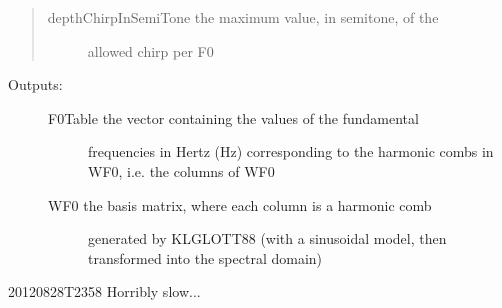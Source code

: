 \documentclass[letterpaper,10pt,english]{sphinxmanual}
\begin{document}
\begin{fulllineitems}
\begin{quote}
\begin{description}
\item[{depthChirpInSemiTone the maximum value, in semitone, of the}] \leavevmode
allowed chirp per F0

\end{description}
\end{quote}
\begin{description}
\item[{Outputs:}] \leavevmode\begin{description}
\item[{F0Table the vector containing the values of the fundamental}] \leavevmode
frequencies in Hertz (Hz) corresponding to the
harmonic combs in WF0, i.e. the columns of WF0

\item[{WF0     the basis matrix, where each column is a harmonic comb}] \leavevmode
generated by KLGLOTT88 (with a sinusoidal model, then
transformed into the spectral domain)

\end{description}

\end{description}

20120828T2358 Horribly slow...

\end{fulllineitems}

\end{document}
